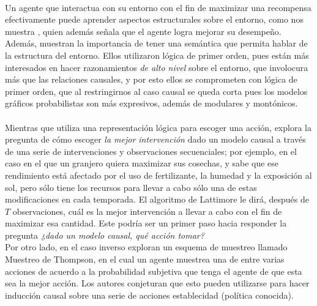 \documentclass[11pt]{article}
\theoremstyle{plain}
\begin{document}
\\
Un agente que interactua con su entorno con el fin de maximizar una recompensa efectivamente puede aprender aspectos estructurales sobre el entorno, como nos muestra \cite{garnelo2016towards}, quien además señala que el agente logra mejorar su desempeño. Además, muestran la importancia de tener una semántica que permita hablar de la estructura del entorno. Ellos utilizaron lógica de primer orden, pues están más interesados en hacer razonamientos \textit{de alto nivel} sobre el entorno, que involocura más que las relaciones causales, y por esto ellos se comprometen con lógica de primer orden, que al restringirnos al caso causal se queda corta pues los modelos gráficos probabilistas son más expresivos, además de modulares y montónicos.\\
\\
Mientras que \cite{garnelo2016towards} utiliza una representación lógica para escoger una acción, \cite{lattimoreNIPS2016} explora la pregunta de cómo escoger \textit{la mejor intervención} dado un modelo causal a través de una serie de intervenciones y observaciones secuenciales; por ejemplo, en el caso en el que un granjero quiera maximizar sus cosechas, y sabe que ese rendimiento está afectado por el uso de fertilizante, la humedad y la exposición al sol, pero sólo tiene los recursos para llevar a cabo sólo una de estas modificaciones en cada temporada. El algoritmo de Lattimore le dirá, después de $T$ observaciones, cuál es la mejor intervención a llevar a cabo con el fin de maximizar esa cantidad. Este podría ser un primer paso hacia responder la pregunta \textit{¿dado un modelo causal, qué acción tomar?}
\\
Por otro lado, en el caso inverso \cite{ortega2014generalized} exploran un esquema de muestreo llamado Muestreo de Thompson, en el cual un agente muestrea una de entre varias acciones de acuerdo a la probabilidad subjetiva que tenga el agente de que esta sea la mejor acción. Los autores conjeturan que esto pueden utilizarse para hacer inducción causal sobre una serie de acciones establecidad (política conocida).


\end{document}
